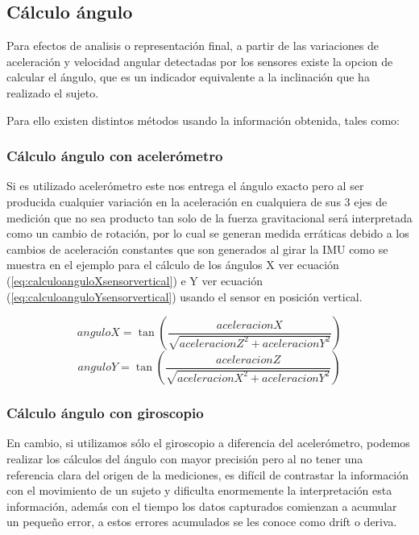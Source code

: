 \documentclass[12pt,a4paper]{article}
\begin{document}
\subsection{Cálculo ángulo} Para efectos de analisis o representación final, a partir de las variaciones de aceleración y velocidad angular detectadas por los sensores existe la opcion de calcular el ángulo, que es un indicador equivalente a la inclinación que ha realizado el sujeto.

Para ello existen distintos métodos usando la información obtenida, tales como:


\subsubsection{Cálculo ángulo con acelerómetro} Si es utilizado acelerómetro este nos entrega el ángulo exacto pero al ser producida cualquier variación en la aceleración en cualquiera de sus 3 ejes de medición que no sea producto tan solo de la fuerza gravitacional será interpretada como un cambio de rotación, por lo cual se generan medida erráticas debido a los cambios de aceleración constantes que son generados al girar la IMU como se muestra en el ejemplo para el cálculo de los ángulos X ver ecuación (\ref{eq:calculoanguloXsensorvertical}) e Y ver ecuación (\ref{eq:calculoanguloYsensorvertical}) usando el sensor en posición vertical.

\begin{figure}[H]
\begin{equation}
anguloX = \tan{\left(\frac{aceleracionX}{\sqrt{aceleracionZ^{2}+aceleracionY^{2}}}\right)}
\label{eq:calculoanguloXsensorvertical}
\end{equation}
\begin{equation}
anguloY = \tan{\left(\frac{aceleracionZ}{\sqrt{aceleracionX^{2}+aceleracionY^{2}}}\right)}
\label{eq:calculoanguloYsensorvertical}
\end{equation}
\end{figure}

\subsubsection{Cálculo ángulo con giroscopio} 
En cambio, si utilizamos sólo el giroscopio a diferencia del acelerómetro, podemos realizar los cálculos del ángulo con mayor precisión pero al no tener una referencia clara del origen de la mediciones, es difícil de contrastar la información con el movimiento de un sujeto y dificulta enormemente la  interpretación esta información, además con el tiempo los datos capturados comienzan a acumular un pequeño error, a estos errores acumulados se les conoce como drift o deriva.
\end{document}
